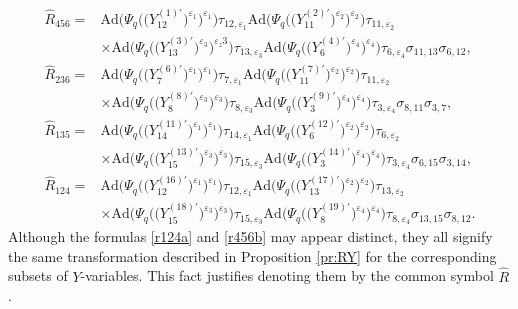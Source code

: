 \documentclass[11pt]{article}
\numberwithin{equation}{section}
\numberwithin{equation}{section}
\begin{document}
\begin{align}
\widehat{R}_{456} ={}&
\mathrm{Ad}\bigl(\Psi_q\bigl(\bigl(Y^{(1)\prime}_{12}\bigr)^{\varepsilon_1}\bigr)^{\varepsilon_1}\bigr)\tau_{12,\varepsilon_1}
\mathrm{Ad}\bigl(\Psi_q\bigl(\bigl(Y^{(2)\prime}_{11}\bigr)^{\varepsilon_2}\bigr)^{\varepsilon_2}\bigr)\tau_{11,\varepsilon_2}\nonumber
\\
& \times
\mathrm{Ad}\bigl(\Psi_q\bigl(\bigl(Y^{(3)\prime}_{13}\bigr)^{\varepsilon_3}\bigr)^{\varepsilon_z3}\bigr)\tau_{13,\varepsilon_3}
\mathrm{Ad}\bigl(\Psi_q\bigl(\bigl(Y^{(4)\prime}_{6}\bigr)^{\varepsilon_4}\bigr)^{\varepsilon_4}\bigr)\tau_{6,\varepsilon_4}
\sigma_{11,13}\sigma_{6,12},\nonumber
\\
\widehat{R}_{236} ={}&
\mathrm{Ad}\bigl(\Psi_q\bigl(\bigl(Y^{(6)\prime}_{7}\bigr)^{\varepsilon_1}\bigr)^{\varepsilon_1}\bigr)\tau_{7,\varepsilon_1}
\mathrm{Ad}\bigl(\Psi_q\bigl(\bigl(Y^{(7)\prime}_{11}\bigr)^{\varepsilon_2}\bigr)^{\varepsilon_2}\bigr)\tau_{11,\varepsilon_2}\nonumber
\\
& \times
\mathrm{Ad}\bigl(\Psi_q\bigl(\bigl(Y^{(8)\prime}_{8}\bigr)^{\varepsilon_3}\bigr)^{\varepsilon_3}\bigr)\tau_{8,\varepsilon_3}
\mathrm{Ad}\bigl(\Psi_q\bigl(\bigl(Y^{(9)\prime}_{3}\bigr)^{\varepsilon_4}\bigr)^{\varepsilon_4}\bigr)\tau_{3,\varepsilon_4}
\sigma_{8,11}\sigma_{3,7},\nonumber
\\
\widehat{R}_{135} ={}&
\mathrm{Ad}\bigl(\Psi_q\bigl(\bigl(Y^{(11)\prime}_{14}\bigr)^{\varepsilon_1}\bigr)^{\varepsilon_1}\bigr)\tau_{14,\varepsilon_1}
\mathrm{Ad}\bigl(\Psi_q\bigl(\bigl(Y^{(12)\prime}_{6}\bigr)^{\varepsilon_2}\bigr)^{\varepsilon_2}\bigr)\tau_{6,\varepsilon_2}\nonumber
\\
& \times
\mathrm{Ad}\bigl(\Psi_q\bigl(\bigl(Y^{(13)\prime}_{15}\bigr)^{\varepsilon_3}\bigr)^{\varepsilon_3}\bigr)\tau_{15,\varepsilon_3}
\mathrm{Ad}\bigl(\Psi_q\bigl(\bigl(Y^{(14)\prime}_{3}\bigr)^{\varepsilon_4}\bigr)^{\varepsilon_4}\bigr)\tau_{3,\varepsilon_4}
\sigma_{6,15}\sigma_{3,14},\nonumber
\\
\widehat{R}_{124} ={}&
\mathrm{Ad}\bigl(\Psi_q\bigl(\bigl(Y^{(16)\prime}_{12}\bigr)^{\varepsilon_1}\bigr)^{\varepsilon_1}\bigr)\tau_{12,\varepsilon_1}
\mathrm{Ad}\bigl(\Psi_q\bigl(\bigl(Y^{(17)\prime}_{13}\bigr)^{\varepsilon_2}\bigr)^{\varepsilon_2}\bigr)\tau_{13,\varepsilon_2}\nonumber
\\
& \times
\mathrm{Ad}\bigl(\Psi_q\bigl(\bigl(Y^{(18)\prime}_{15}\bigr)^{\varepsilon_3}\bigr)^{\varepsilon_3}\bigr)\tau_{15,\varepsilon_3}
\mathrm{Ad}\bigl(\Psi_q\bigl(\bigl(Y^{(19)\prime}_{8}\bigr)^{\varepsilon_4}\bigr)^{\varepsilon_4}\bigr)\tau_{8,\varepsilon_4}
\sigma_{13,15}\sigma_{8,12}.\label{r456b}
\end{align}
Although the formulas \eqref{r124a} and \eqref{r456b} may appear distinct,
they all signify the same transformation described in Proposition \ref{pr:RY}
for the corresponding subsets of $Y$-variables.
This fact justifies denoting them by the common symbol $\widehat{R}$.
\end{document}
